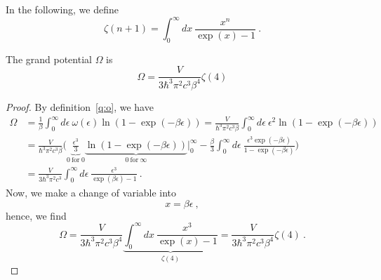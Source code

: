     In the following, we define 
    \begin{equation}
        \zeta (n+1) = \int_0^\infty dx ~ \frac{x^n}{\exp(x) - 1} ~.
    \end{equation}

    The grand potential $\Omega$ is 
    \begin{equation*}
        \Omega = \frac{V}{3 \hbar^3 \pi^2 c^3 \beta^4} \zeta(4) 
    \end{equation*}
    \begin{proof}
        By definition~\eqref{q:o}, we have 
        \begin{equation}
        \begin{aligned}
            \Omega & = \frac{1}{\beta} \int_0^\infty d\epsilon ~ \omega(\epsilon) \ln(1 - \exp(- \beta \epsilon)) = \frac{V}{\hbar^3 \pi^2 c^3 \beta} \int_0^\infty d\epsilon ~ \epsilon^2 \ln(1 - \exp(- \beta \epsilon)) \\ & = \frac{V}{\hbar^3 \pi^2 c^3 \beta} \Big ( \underbrace{\frac{\epsilon^3}{3} }_{0 ~ \text{for} ~ 0}\underbrace{\ln(1 - \exp(- \beta \epsilon)) }_{0 ~ \text{for} ~ \infty} \Big \vert_0^\infty - \frac{\beta}{3} \int_0^\infty d\epsilon ~ \frac{\epsilon^3 \exp(- \beta \epsilon)}{1 - \exp(- \beta \epsilon)} \Big) \\ & = \frac{V}{3 \hbar^3 \pi^2 c^3} \int_0^\infty d\epsilon ~ \frac{\epsilon^3}{\exp(\beta \epsilon) - 1} ~.
        \end{aligned}
        \end{equation}
        Now, we make a change of variable into 
        \begin{equation}
            x = \beta \epsilon ~,
        \end{equation}
        hence, we find 
        \begin{equation*}
        \Omega = \frac{V}{3 \hbar^3 \pi^2 c^3 \beta^4} \underbrace{\int_0^\infty dx ~ \frac{x^3}{\exp(x) - 1}}_{\zeta(4)} = \frac{V}{3 \hbar^3 \pi^2 c^3 \beta^4} \zeta(4) ~.
        \end{equation*}
    \end{proof}

